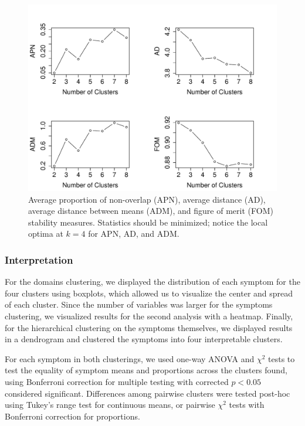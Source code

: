 \documentclass[preprint,5p]{elsarticle} %
\begin{document}
\begin{figure}[h]
  \centering
  \includegraphics[width=\linewidth]{stability-measures.pdf}
  \caption{Average proportion of non-overlap (APN), average distance (AD), average distance
    between means (ADM), and figure of merit (FOM) stability measures\cite{datta2006methods,
    yeung2001validating}. Statistics should be minimized; notice the local optima at $k = 4$ for
  APN, AD, and ADM.}
  \label{fig:stability}
\end{figure}

\subsubsection{Interpretation}

For the domains clustering, we displayed the distribution of each symptom for the four
clusters using boxplots, which allowed us to visualize the center and spread of each cluster. Since
the number of variables was larger for the symptoms clustering, we visualized results for the
second analysis with a heatmap. Finally, for the hierarchical clustering on the symptoms
themselves, we displayed results in a dendrogram and clustered the symptoms into four interpretable
clusters.

For each symptom in both clusterings, we used one-way ANOVA and $\chi^2$ tests to test the equality
of symptom means and proportions across the clusters found, using Bonferroni correction for
multiple testing with corrected $p < 0.05$ considered significant. Differences among pairwise
clusters were tested post-hoc using Tukey's range test for continuous means, or pairwise $\chi^2$
tests with Bonferroni correction for proportions.
\end{document}

